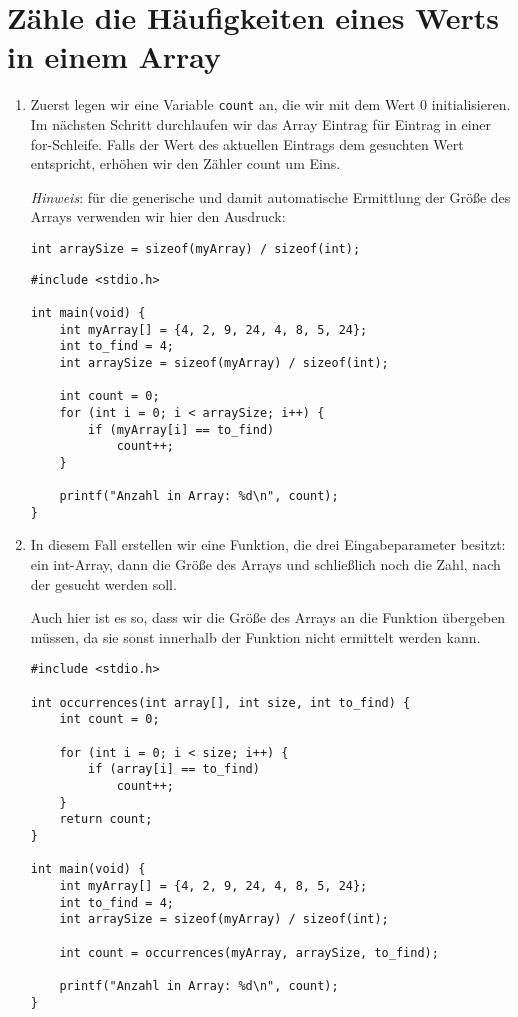 \chapter{Zähle die Häufigkeiten eines Werts in einem Array}

\begin{enumerate}
\item Zuerst legen wir eine Variable \texttt{count} an, die wir mit dem
Wert 0 initialisieren. Im nächsten Schritt durchlaufen wir das Array Eintrag
für Eintrag in einer for-Schleife. Falls der Wert des aktuellen Eintrags dem
gesuchten Wert entspricht, erhöhen wir den Zähler count um Eins.

\textit{Hinweis}: für die generische und damit automatische Ermittlung der
Größe des Arrays verwenden wir hier den Ausdruck:

\noindent\texttt{int arraySize = sizeof(myArray) / sizeof(int);}

\begin{verbatim}
#include <stdio.h>

int main(void) {
    int myArray[] = {4, 2, 9, 24, 4, 8, 5, 24};
    int to_find = 4;
    int arraySize = sizeof(myArray) / sizeof(int);

    int count = 0;
    for (int i = 0; i < arraySize; i++) {
        if (myArray[i] == to_find)
            count++;
    }

    printf("Anzahl in Array: %d\n", count);
}
\end{verbatim}

\item In diesem Fall erstellen wir eine Funktion, die drei Eingabeparameter
besitzt: ein int-Array, dann die Größe des Arrays und schließlich noch die
Zahl, nach der gesucht werden soll.

Auch hier ist es so, dass wir die Größe des Arrays an die Funktion übergeben
müssen, da sie sonst innerhalb der Funktion nicht ermittelt werden kann.

\begin{verbatim}
#include <stdio.h>

int occurrences(int array[], int size, int to_find) {
    int count = 0;

    for (int i = 0; i < size; i++) {
        if (array[i] == to_find)
            count++;
    }
    return count;
}

int main(void) {
    int myArray[] = {4, 2, 9, 24, 4, 8, 5, 24};
    int to_find = 4;
    int arraySize = sizeof(myArray) / sizeof(int);

    int count = occurrences(myArray, arraySize, to_find);

    printf("Anzahl in Array: %d\n", count);
}
\end{verbatim}

\end{enumerate}



